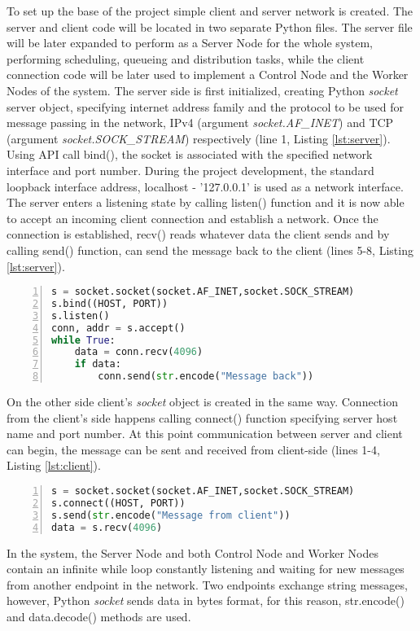 \documentclass[10pt]{report}
\begin{document}
To set up the base of the project simple client and server network is created. The server and client code will be located in two separate Python files. The server file will be later expanded to perform as a Server Node for the whole system, performing scheduling, queueing and distribution tasks, while the client connection code will be later used to implement a Control Node and the Worker Nodes of the system. The server side is first initialized, creating Python \textit{socket} server object, specifying internet address family and the protocol to be used for message passing in the network, IPv4 (argument \textit{socket.AF\_INET}) and TCP (argument \textit{socket.SOCK\_STREAM}) respectively (line 1, Listing \ref{lst:server}). Using API call bind(), the socket is associated with the specified network interface and port number. During the project development, the standard loopback interface address, localhost - '127.0.0.1' is used as a network interface. The server enters a listening state by calling listen() function and it is now able to accept an incoming client connection and establish a network. Once the connection is established, recv() reads whatever data the client sends and by calling send() function, can send the message back to the client (lines 5-8, Listing \ref{lst:server}).
\begin{lstlisting}[numbers=left, language=Python, caption={Server socket}, label={lst:server}]
s = socket.socket(socket.AF_INET,socket.SOCK_STREAM)
s.bind((HOST, PORT))
s.listen()
conn, addr = s.accept()
while True:
    data = conn.recv(4096)
    if data:
        conn.send(str.encode("Message back"))
\end{lstlisting}
On the other side client's \textit{socket} object is created in the same way. Connection from the client's side happens calling connect() function specifying server host name and port number. At this point communication between server and client can begin, the message can be sent and received from client-side (lines 1-4, Listing \ref{lst:client}).
\begin{lstlisting}[numbers=left, language=Python, caption={Client socket}, label={lst:client}]
s = socket.socket(socket.AF_INET,socket.SOCK_STREAM)
s.connect((HOST, PORT))
s.send(str.encode("Message from client"))
data = s.recv(4096)
\end{lstlisting}

In the system, the Server Node and both Control Node and Worker Nodes contain an infinite while loop constantly listening and waiting for new messages from another endpoint in the network. Two endpoints exchange string messages, however, Python \textit{socket} sends data in bytes format, for this reason, str.encode() and data.decode() methods are used.
\end{document}
